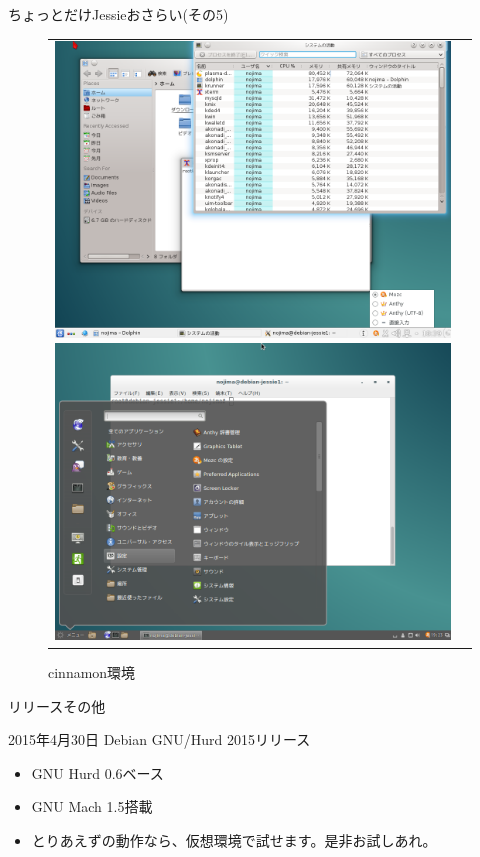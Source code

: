 \begin{frame}{ちょっとだけJessieおさらい(その5)}

\begin{figure}[htbp]
\begin{tabular}{cc}
\begin{minipage}{0.5\hsize}
\includegraphics[width=0.8\hsize]{image201509/debian8-kde.png}
\caption{KDE環境}
\end{minipage}
\begin{minipage}{0.5\hsize}
\includegraphics[width=0.8\hsize]{image201509/debian8-cinnamon.png}
\caption{cinnamon環境}
\end{minipage}
\end{tabular}
\end{figure}

\end{frame}

\begin{frame}{リリースその他}
  \begin{center}
    \Large
2015年4月30日 Debian GNU/Hurd 2015リリース
  \end{center}

\begin{itemize}
\item GNU Hurd 0.6ベース
\item GNU Mach 1.5搭載
\item とりあえずの動作なら、仮想環境で試せます。是非お試しあれ。
\end{itemize}

\end{frame}

